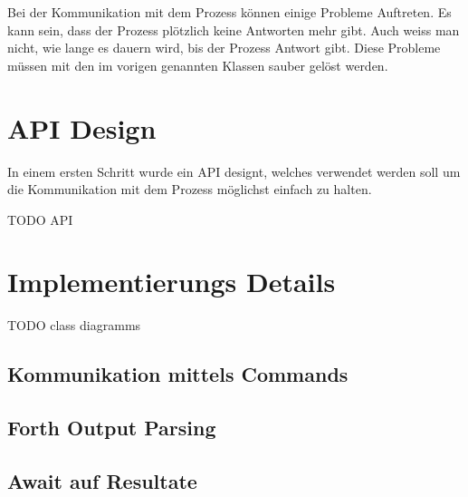 Bei der Kommunikation mit dem Prozess können einige Probleme Auftreten. Es kann sein, dass der Prozess plötzlich keine Antworten mehr gibt. Auch weiss man nicht, wie lange es dauern wird, bis der Prozess Antwort gibt. Diese Probleme müssen mit den im vorigen genannten Klassen sauber gelöst werden.

\section{API Design}

In einem ersten Schritt wurde ein API designt, welches verwendet werden soll um die Kommunikation mit dem Prozess möglichst einfach zu halten.

TODO API

\section{Implementierungs Details}

TODO class diagramms

\subsection{Kommunikation mittels Commands}

\subsection{Forth Output Parsing}

\subsection{Await auf Resultate}

